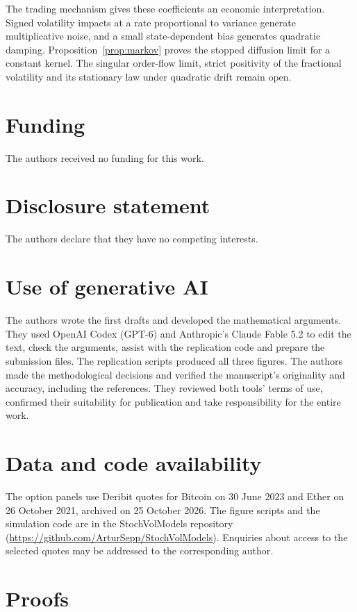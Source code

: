 \documentclass[11pt,a4paper]{article}
\theoremstyle{definition}
\begin{document}
The trading mechanism gives these coefficients an economic interpretation. Signed volatility impacts at a rate proportional to variance generate multiplicative noise, and a small state-dependent bias generates quadratic damping. Proposition~\ref{prop:markov} proves the stopped diffusion limit for a constant kernel. The singular order-flow limit, strict positivity of the fractional volatility and its stationary law under quadratic drift remain open.
\section*{Funding}
The authors received no funding for this work.

\section*{Disclosure statement}
The authors declare that they have no competing interests.

\section*{Use of generative AI}
The authors wrote the first drafts and developed the mathematical arguments. They used OpenAI Codex (GPT-6) and Anthropic's Claude Fable 5.2 to edit the text, check the arguments, assist with the replication code and prepare the submission files. The replication scripts produced all three figures. The authors made the methodological decisions and verified the manuscript's originality and accuracy, including the references. They reviewed both tools' terms of use, confirmed their suitability for publication and take responsibility for the entire work.

\section*{Data and code availability}
The option panels use Deribit quotes for Bitcoin on 30 June 2023 and Ether on 26 October 2021, archived on 25 October 2026. The figure scripts and the simulation code are in the StochVolModels repository (\url{https://github.com/ArturSepp/StochVolModels}). Enquiries about access to the selected quotes may be addressed to the corresponding author.

\appendix

\section{Proofs}\label{app:proofs}
\end{document}
